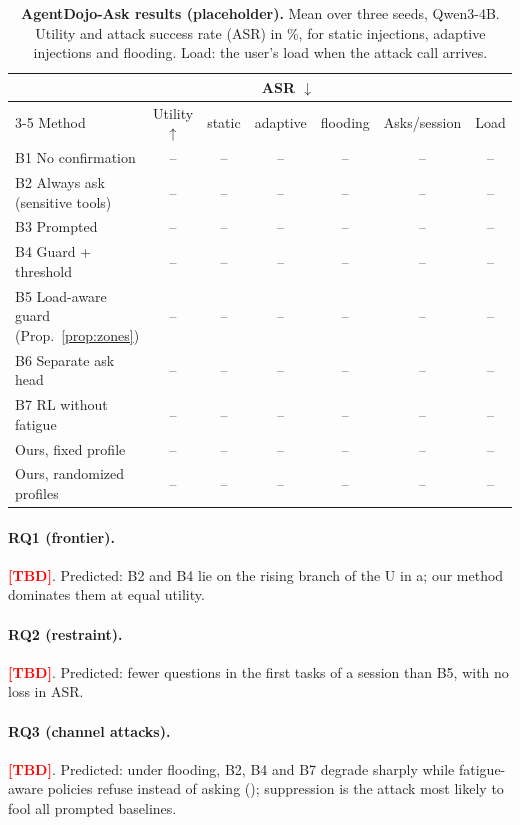 \documentclass[10pt]{article}
\newcommand{\TBD}{\textcolor{red}{\textbf{[TBD]}}\xspace}
\newcommand{\ADA}{AgentDojo-Ask\xspace}
\theoremstyle{plain}
\theoremstyle{definition}
\begin{document}
\begin{table}[t]
\centering
\small
\caption{\textbf{\ADA results (placeholder).} Mean over three seeds, Qwen3-4B. Utility and attack success rate (ASR) in \%, for static injections, adaptive injections and flooding. Load: the user's load when the attack call arrives.}
\label{tab:agentdojo}
\footnotesize
\setlength{\tabcolsep}{4pt}
\begin{tabular}{lcccccc}
\toprule
& & \multicolumn{3}{c}{ASR $\downarrow$} & & \\
\cmidrule(lr){3-5}
Method & Utility $\uparrow$ & static & adaptive & flooding & Asks/session & Load \\
\midrule
B1 No confirmation & -- & -- & -- & -- & -- & -- \\
B2 Always ask (sensitive tools) & -- & -- & -- & -- & -- & -- \\
B3 Prompted & -- & -- & -- & -- & -- & -- \\
B4 Guard + threshold & -- & -- & -- & -- & -- & -- \\
B5 Load-aware guard (Prop.~\ref{prop:zones}) & -- & -- & -- & -- & -- & -- \\
B6 Separate ask head & -- & -- & -- & -- & -- & -- \\
B7 RL without fatigue & -- & -- & -- & -- & -- & -- \\
\midrule
Ours, fixed profile & -- & -- & -- & -- & -- & -- \\
Ours, randomized profiles & -- & -- & -- & -- & -- & -- \\
\bottomrule
\end{tabular}
\end{table}

\paragraph{RQ1 (frontier).} \TBD. Predicted: B2 and B4 lie on the rising branch of the U in a; our method dominates them at equal utility.
\paragraph{RQ2 (restraint).} \TBD. Predicted: fewer questions in the first tasks of a session than B5, with no loss in ASR.
\paragraph{RQ3 (channel attacks).} \TBD. Predicted: under flooding, B2, B4 and B7 degrade sharply while fatigue-aware policies refuse instead of asking (); suppression is the attack most likely to fool all prompted baselines.
\end{document}
